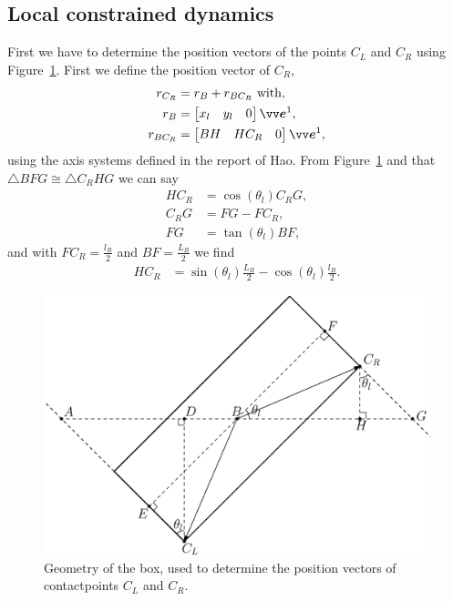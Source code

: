 \documentclass[DC2017114Bouma.tex]{subfiles}
\begin{document}
\subsection*{Local constrained dynamics}
First we have to determine the position vectors of the points $C_L$ and $C_R$ using Figure~\ref{fig:plankboxgeo}. First we define the position vector of $C_R$,
\begin{align}
r_{C_R} &= r_B + r_{BC_R}\ \text{with},\\
r_B &= \begin{bmatrix}
x_l & y_l & 0
\end{bmatrix} \evec^1,\\
r_{BC_R} &= \begin{bmatrix}
BH & HC_R & 0
\end{bmatrix} \evec^1,
\end{align}
using the axis systems defined in the report of Hao. From Figure~\ref{fig:plankboxgeo} and that $\triangle BFG \cong \triangle C_RHG$ we can say
\begin{align}
HC_R &= \cos(\theta_l)C_RG,\\
C_RG &= FG - FC_R,\\
FG &= \tan(\theta_l)BF,
\end{align}
and with $FC_R = \frac{l_B}{2}$ and $BF = \frac{L_B}{2}$ we find
\begin{align}
HC_R &= \sin(\theta_l)\frac{L_B}{2} - \cos(\theta_l)\frac{l_B}{2}.
\end{align}
\begin{figure}[h]
\centering
\includegraphics[width=\textwidth]{plankboxgeo.eps}\caption{Geometry of the box, used to determine the position vectors of contactpoints $C_L$ and $C_R$.}\label{fig:plankboxgeo}
\end{figure}
\end{document}
